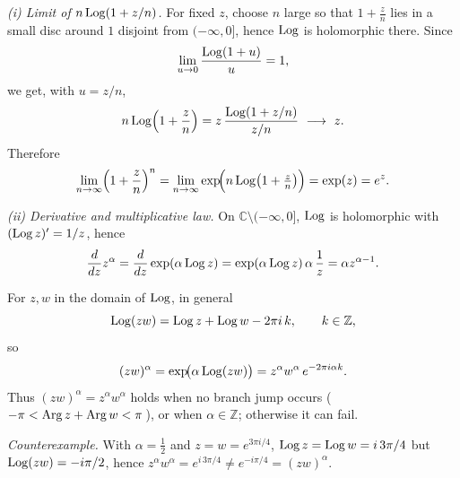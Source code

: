 \begin{solution}
\emph{(i) Limit of $n\operatorname{Log}(1+z/n)$.}
For fixed $z$, choose $n$ large so that $1+\frac{z}{n}$ lies in a small disc around $1$
disjoint from $(-\infty,0]$, hence $\operatorname{Log}$ is holomorphic there. Since
\[
\lim_{u\to 0}\frac{\operatorname{Log}(1+u)}{u}=1,
\]
we get, with $u=z/n$,
\[
n\operatorname{Log}\Bigl(1+\frac{z}{n}\Bigr)
= z\,\frac{\operatorname{Log}(1+z/n)}{z/n}\ \longrightarrow\ z.
\]
Therefore
\[
\lim_{n\to\infty}\Bigl(1+\frac{z}{n}\Bigr)^n
=\lim_{n\to\infty}\exp\!\Bigl(n\operatorname{Log}\bigl(1+\tfrac{z}{n}\bigr)\Bigr)
=\exp(z)=e^z.
\]

\emph{(ii) Derivative and multiplicative law.}
On $\mathbb C\setminus(-\infty,0]$, $\operatorname{Log}$ is holomorphic with $(\operatorname{Log} z)'=1/z$, hence
\[
\frac{d}{dz}z^\alpha
=\frac{d}{dz}\exp(\alpha\operatorname{Log} z)
=\exp(\alpha\operatorname{Log} z)\,\alpha\,\frac1z
=\alpha z^{\alpha-1}.
\]

For $z,w$ in the domain of $\operatorname{Log}$, in general
\[
\operatorname{Log}(zw)=\operatorname{Log} z+\operatorname{Log} w-2\pi i\,k,\qquad k\in\mathbb Z,
\]
so
\[
(zw)^\alpha
=\exp\!\bigl(\alpha\operatorname{Log}(zw)\bigr)
=z^\alpha w^\alpha\,e^{-2\pi i\alpha k}.
\]
Thus $(zw)^\alpha=z^\alpha w^\alpha$ holds when no branch jump occurs
(\,$-\pi<\operatorname{Arg} z+\operatorname{Arg} w<\pi$\,), or when $\alpha\in\mathbb Z$; otherwise it can fail.

\emph{Counterexample.} With $\alpha=\tfrac12$ and $z=w=e^{3\pi i/4}$,
$\operatorname{Log} z=\operatorname{Log} w=i\,3\pi/4$ but $\operatorname{Log}(zw)=-i\pi/2$, hence
$z^\alpha w^\alpha=e^{i\,3\pi/4}\neq e^{-i\pi/4}=(zw)^\alpha$.
\end{solution}

